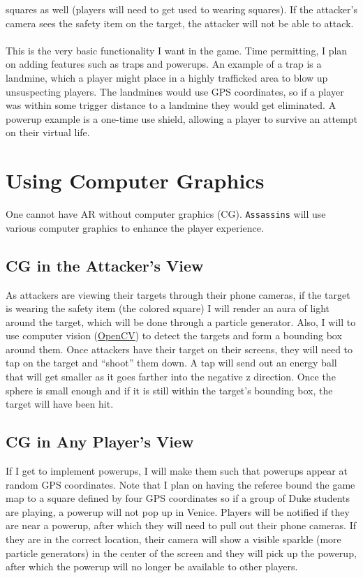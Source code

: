 \documentclass{article}
\begin{document}
squares as well (players will need to get used to wearing squares).
If the attacker's camera sees the safety item on the target, 
the attacker will not be able to attack.
\\\\
This is the very basic functionality I want in the game. Time permitting,
I plan on adding features such as traps and powerups. An example of a trap
is a landmine, which a player might place in a highly trafficked area
to blow up unsuspecting players. The landmines would use GPS
coordinates, so if a player was within some trigger distance to a landmine they would
get eliminated. A powerup example is a one-time use shield, allowing a player to survive
an attempt on their virtual life.

\section{Using Computer Graphics}
One cannot have AR without computer graphics (CG). \texttt{Assassins} will use various computer 
graphics to enhance the player experience. 
\subsection{CG in the Attacker's View}
As attackers are viewing their targets through their phone cameras, if the target is wearing the
safety item (the colored square) I will render an aura of light around the target,
which will be done through a particle generator.
Also, I will to use computer vision (\href{http://opencv.org/}{OpenCV}) to detect the 
targets and form a bounding box around them. 
Once attackers have their target on their screens, they will need to tap 
on the target and ``shoot'' them down.
A tap will send out an energy ball that will get
smaller as it goes farther into the negative z direction. Once the 
sphere is small enough and if it is still within the target's bounding box,
the target will have been hit.
\subsection{CG in Any Player's View}
If I get to implement powerups, I will make them such that
powerups appear at random GPS coordinates. Note that I plan on 
having the referee bound the game map to a square defined by four GPS 
coordinates so if a group of Duke students are playing, a powerup will
not pop up in Venice. Players will be notified if they are near a powerup, after
which they will need to pull out their phone cameras. If they are in the correct
location, their camera will show a visible sparkle (more particle generators) 
in the center of the screen
and they will pick up the powerup, after which the powerup will no longer be 
available to other players.
\end{document}
